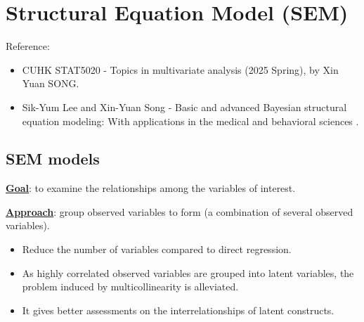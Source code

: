 \documentclass[10pt,a4paper]{book}
\begin{document}
\chapter{Structural Equation Model (SEM)}\label{chap:SEM}
Reference: 
\begin{itemize}
	\item CUHK STAT5020 - Topics in multivariate analysis (2025 Spring), by Xin Yuan SONG.
	\item Sik-Yum Lee and Xin-Yuan Song - Basic and advanced
	Bayesian structural equation modeling: With applications in the
	medical and behavioral sciences \cite{lee2012basic}.
\end{itemize}

\section{SEM models}\label{sec:SEM_models}

\noindent \textbf{\underline{Goal}}: to examine the relationships among the variables of interest.

\noindent \textbf{\underline{Approach}}: group observed variables to form  (a combination of several observed variables).
\begin{itemize}
	\item Reduce the number of variables compared to direct regression.
	\item As highly correlated observed variables are grouped into latent variables, the problem induced by multicollinearity is alleviated.
	\item It gives better assessments on the interrelationships of latent constructs.
\end{itemize}
\end{document}
